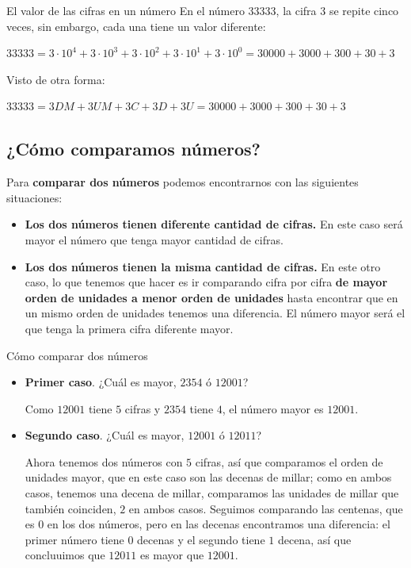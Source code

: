 \begin{ejemplos}[label={Ejemplo:valorCifras}]{El valor de las cifras en un número}
    En el número $33333$, la cifra $3$ se repite cinco veces, sin embargo, cada una tiene un valor diferente:

    $33333 = 3 \cdot 10^4 + 3 \cdot 10^3 + 3 \cdot 10^ 2 + 3 \cdot 10^1 + 3 \cdot 10^0 = 30000 + 3000 + 300 + 30 + 3$

    Visto de otra forma:

    $33333 = 3 DM + 3 UM + 3 C + 3 D + 3 U = 30000 + 3000 + 300 + 30 + 3$
\end{ejemplos}

\subsection{¿Cómo comparamos números?}

Para \textbf{comparar dos números} podemos encontrarnos con las siguientes situaciones:

\begin{itemize}
    \item \textbf{Los dos números tienen diferente cantidad de cifras.} En este caso será mayor el número que tenga mayor cantidad de cifras.
    \item \textbf{Los dos números tienen la misma cantidad de cifras.} En este otro caso, lo que tenemos que hacer es ir comparando cifra por cifra \textbf{de mayor orden de unidades a menor orden de unidades} hasta encontrar que en un mismo orden de unidades tenemos una diferencia. El número mayor será el que tenga la primera cifra diferente mayor.
\end{itemize}

\begin{ejemplos}[label={Ejemplo:comparacionNumeros}]{Cómo comparar dos números}
    \begin{itemize}
        \item \textbf{Primer caso}. ¿Cuál es mayor, $2354$ ó $12001$?

        Como $12001$ tiene $5$ cifras y $2354$ tiene $4$, el número mayor es $12001$.

        \item \textbf{Segundo caso}. ¿Cuál es mayor, $12001$ ó $12011$?

        Ahora tenemos dos números con $5$ cifras, así que comparamos el orden de unidades mayor, que en este caso son las decenas de millar; como en ambos casos, tenemos una decena de millar, comparamos las unidades de millar que también coinciden, $2$ en ambos casos. Seguimos comparando las centenas, que es $0$ en los dos números, pero en las decenas encontramos una diferencia: el primer número tiene $0$ decenas y el segundo tiene $1$ decena, así que concluuimos que $12011$ es mayor que $12001$.
    \end{itemize}
\end{ejemplos}

